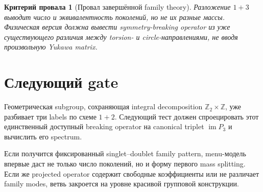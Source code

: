 \documentclass[12pt,a4paper]{article}
\newtheorem{nogocriterion}{Критерий провала}
\begin{document}
\begin{nogocriterion}[Провал завершённой family theory]
Разложение \(1+3\) выводит число и эквивалентность поколений, но не их разные массы. Физическая версия должна вывести symmetry-breaking operator из уже существующего различия между torsion- и circle-направлениями, не вводя произвольную Yukawa matrix.
\end{nogocriterion}

\section{Следующий gate}

Геометрическая subgroup, сохраняющая integral decomposition \(\mathbb Z_2\times\mathbb Z\), уже разбивает три labels по схеме \(1+2\). Следующий тест должен спроецировать этот единственный доступный breaking operator на canonical triplet \(\operatorname{im}P_3\) и вычислить его spectrum.

Если получится фиксированный singlet--doublet family pattern, menu-модель впервые даст не только число поколений, но и форму первого mass splitting. Если же projected operator содержит свободные коэффициенты или не различает family modes, ветвь закроется на уровне красивой групповой конструкции.
\end{document}
